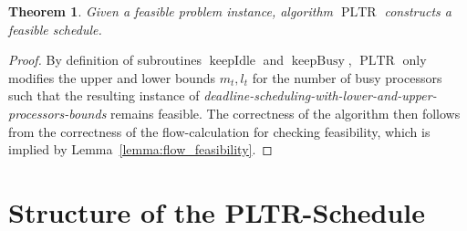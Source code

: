 \documentclass[a4paper]{article}
\DeclareMathOperator{\PLTR}{PLTR}
\DeclareMathOperator{\keepidle}{keepIdle}
\DeclareMathOperator{\keepbusy}{keepBusy}
\newtheorem{theorem}{Theorem}
\begin{document}
\begin{theorem}\label{theorem:feasibility}
  Given a feasible problem instance, algorithm $\PLTR$ constructs a feasible schedule.
\end{theorem}
\begin{proof}
  By definition of subroutines $\keepidle$ and $\keepbusy$, $\PLTR$ only modifies the upper and lower bounds $m_t, l_t$ for the number of busy processors such that the resulting instance of \emph{deadline-scheduling-with-lower-and-upper-processors-bounds} remains feasible.
  The correctness of the algorithm then follows from the correctness of the flow-calculation for checking feasibility, which is implied by Lemma~\ref{lemma:flow_feasibility}.
\end{proof}

\section{Structure of the PLTR-Schedule}\label{section:structure}
\end{document}
